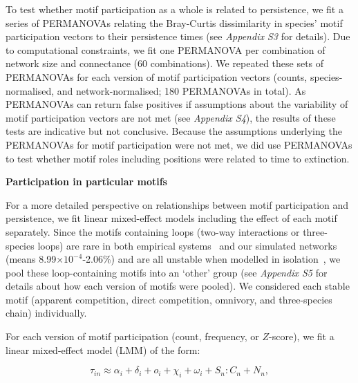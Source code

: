 \documentclass[12pt]{article}
\begin{document}
\begin{spacing}{2.0}
                To test whether motif participation as a whole is related to persistence, we fit a series of PERMANOVAs relating the Bray-Curtis dissimilarity in species' motif participation vectors to their persistence times (see \emph{Appendix S3} for details). 
                Due to computational constraints, we fit one PERMANOVA per combination of network size and connectance (60 combinations). 
                We repeated these sets of PERMANOVAs for each version of motif participation vectors (counts, species-normalised, and network-normalised; 180 PERMANOVAs in total).
                As PERMANOVAs can return false positives if assumptions about the variability of motif participation vectors are not met (see \emph{Appendix S4}), the results of these tests are indicative but not conclusive.
                Because the assumptions underlying the PERMANOVAs for motif participation were not met, we did use PERMANOVAs to test whether motif roles including positions were related to time to extinction.


            \textbf{Participation in particular motifs}

                For a more detailed perspective on relationships between motif participation and persistence, we fit linear mixed-effect models including the effect of each motif separately.
                Since the motifs containing loops (two-way interactions or three-species loops) are rare in both empirical systems~\citep{Stouffer2007} and our simulated networks (means 8.99$\times10^{-4}$-2.06\%) and are all unstable when modelled in isolation~\citep{Borrelli2015a}, we pool these loop-containing motifs into an `other' group (see \emph{Appendix S5} for details about how each version of motifs were pooled). 
                We considered each stable motif (apparent competition, direct competition, omnivory, and three-species chain) individually.


                For each version of motif participation (count, frequency, or $Z$-score), we fit a  linear mixed-effect model (LMM) of the form:

                \begin{equation}
                    \tau_{in} \approx \alpha_{i} + \delta_{i} + o_{i} + \chi_{i} + \omega_{i} + S_{n}:C_{n} +N_n,
                    \label{eq:persistence_motifs}
                \end{equation}


\end{spacing}
\end{document}

